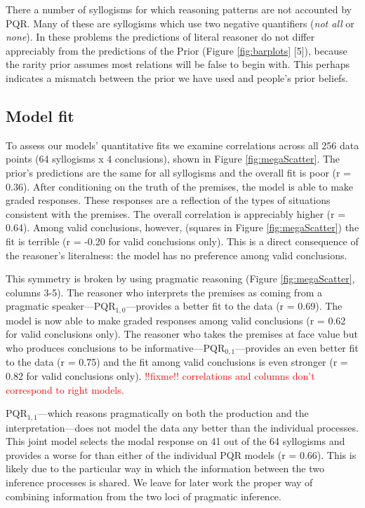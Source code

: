 \documentclass[10pt,letterpaper]{article}
\newcommand{\red}[1]{\textcolor{Red}{#1}}
\begin{document}
There a number of syllogisms for which reasoning patterns are not accounted by PQR. Many of these are syllogisms which use two negative quantifiers (\emph{not all} or \emph{none}). In these problems the predictions of literal reasoner do not differ appreciably from the predictions of the Prior (Figure \ref{fig:barplots} [5]), because the rarity prior assumes most relations will be false to begin with. This perhaps indicates a mismatch between the prior we have used and people's prior beliefs.

\subsection{Model fit}

To assess our models' quantitative fits we examine correlations across all 256 data points (64 syllogisms x 4 conclusions), shown in Figure \ref{fig:megaScatter}.
%
The prior's predictions are the same for all syllogisms and the overall fit is poor (r = 0.36).  After conditioning on the truth of the premises, the model is able to make graded responses. These responses are a reflection of the types of situations consistent with the premises. The overall correlation is appreciably higher (r = 0.64). Among valid conclusions, however, (squares in Figure \ref{fig:megaScatter}) the fit is terrible (r = -0.20 for valid conclusions only). This is a direct consequence of the reasoner's literalness: the model has no preference among valid conclusions.

This symmetry is broken by using pragmatic reasoning (Figure \ref{fig:megaScatter}, columns 3-5). The reasoner who interprets the premises as coming from a pragmatic speaker---PQR$_{1,0}$---provides a better fit to the data (r = 0.69). The model is now able to make graded responses among valid conclusions (r = 0.62 for valid conclusions only). The reasoner who takes the premises at face value but who produces conclusions to be informative---PQR$_{0,1}$---provides an even better fit to the data (r = 0.75) and the fit among valid conclusions is even stronger (r = 0.82 for valid conclusions only).  \red{!!fixme!! correlations and columns don't correspond to right models.}

PQR$_{1,1}$---which reasons pragmatically on both the production and the interpretation---does not model the data any better than the individual processes. This joint model selects the modal response on 41 out of the 64 syllogisms and provides a worse for than either of the individual PQR models (r = 0.66). This is likely due to the particular way in which the information between the two inference processes is shared. We leave for later work the proper way of combining information from the two loci of pragmatic inference.
\end{document}
